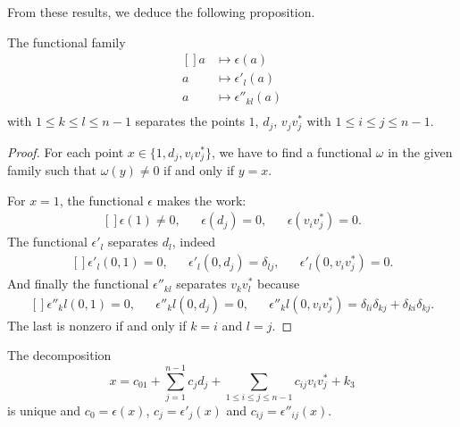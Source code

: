 From these results, we deduce the following proposition.
\begin{proposition}
	The functional family
	\begin{equation}
		\begin{aligned}[]
			a & \mapsto\epsilon(a)        \\
			a & \mapsto\epsilon'_l(a)     \\
			a & \mapsto\epsilon''_{kl}(a) \\
		\end{aligned}
	\end{equation}
	with $1\leq k\leq l\leq n-1$ separates the points $1$, $d_j$, $v_jv_j^*$ with $1\leq i\leq j\leq n-1$.
\end{proposition}

\begin{proof}
	For each point $x\in\{ 1,d_j,v_iv_j^* \}$, we have to find a functional $\omega$ in the given family such that $\omega(y)\neq 0$ if and only if $y=x$.

	For $x=1$, the functional $\epsilon$ makes the work:
	\begin{equation}
		\begin{aligned}[]
			\epsilon(1)\neq 0, &  & \epsilon(d_j)=0, &  & \epsilon(v_iv_j^*)=0.
		\end{aligned}
	\end{equation}
	The functional $\epsilon'_l$ separates $d_l$, indeed
	\begin{equation}
		\begin{aligned}[]
			\epsilon'_l(0,1)=0, &  & \epsilon'_l(0,d_j)=\delta_{lj}, &  & \epsilon'_l(0,v_iv_j^*)=0.
		\end{aligned}
	\end{equation}
	And finally the functional $\epsilon''_{kl}$ separates $v_kv_l^*$ because
	\begin{equation}
		\begin{aligned}[]
			\epsilon''_kl(0,1)=0, &  & \epsilon''_kl(0,d_j)=0, &  & \epsilon''_kl(0,v_iv_j^*)=\delta_{li}\delta_{kj}+\delta_{ki}\delta_{kj}.
		\end{aligned}
	\end{equation}
	The last is nonzero if and only if $k=i$ and $l=j$.
\end{proof}


\begin{proposition}     \label{PropDecompxczepsApp}
	The decomposition
	\begin{equation}
		x=c_01+\sum_{j=1}^{n-1}c_jd_j+\sum_{1\leq i\leq j\leq n-1}c_{ij}v_iv_j^*+k_3
	\end{equation}
	is unique and $c_0=\epsilon(x)$, $c_j=\epsilon'_j(x)$ and $c_{ij}=\epsilon''_{ij}(x)$.
\end{proposition}

